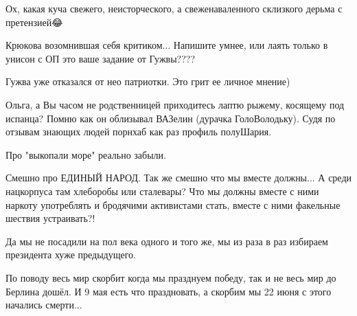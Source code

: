 \begin{itemize}
\begin{itemize}
Ох, какая куча свежего, неисторческого, а свеженаваленного склизкого дерьма с претензией😂

 
Крюкова возомнившая себя критиком... Напишите умнее, или лаять только в унисон с ОП это ваше задание от Гужвы????

 
Гужва уже отказался от нео патриотки.
Это грит ее личное мнение)

 
Ольга, а Вы часом не родственницей приходитесь лаптю рыжему, косящему под
испанца? Помню как он облизывал ВАЗелин (дурачка ГолоВолодьку). Судя по отзывам
знающих людей порнхаб как раз профиль полуШария.

 
Про "выкопали море" реально забыли.

 

Смешно про ЕДИНЫЙ НАРОД. Так же смешно что мы вместе должны... А среди
нацкорпуса там хлеборобы или сталевары? Что мы должны вместе с ними наркоту
употреблять и бродячими активистами стать, вместе с ними факельные шествия
устраивать?!

Да мы не посадили на пол века одного и того же, мы из раза в раз избираем
президента хуже предыдущего.

По поводу весь мир скорбит когда мы празднуем победу, так и не весь мир до
Берлина дошёл. И 9 мая есть что праздновать, а скорбим мы 22 июня с этого
начались смерти...


\end{itemize}
\end{itemize}
